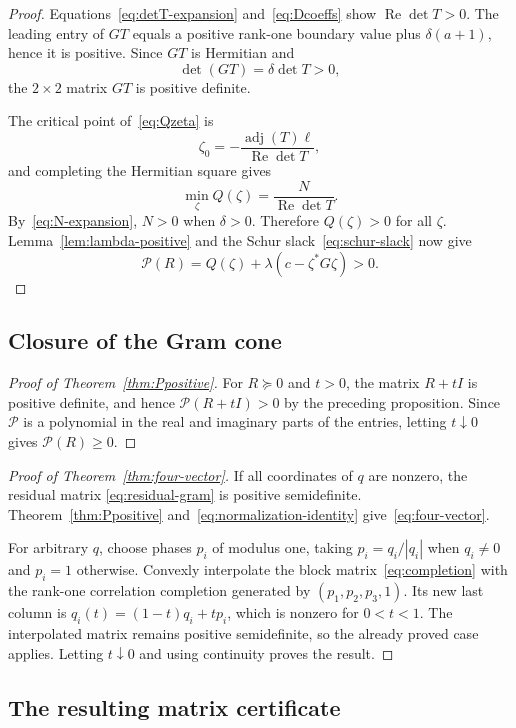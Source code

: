 \documentclass[11pt]{article}
\theoremstyle{definition}
\newcommand{\Rea}{\operatorname{Re}}
\newcommand{\adj}{\operatorname{adj}}
\newcommand{\psd}{\succeq 0}
\begin{document}
\begin{proof}
Equations~\eqref{eq:detT-expansion} and~\eqref{eq:Dcoeffs} show
$\Rea\det T>0$.  The leading entry of $GT$ equals a positive rank-one
boundary value plus $\delta(a+1)$, hence it is positive.  Since $GT$ is
Hermitian and
\[
 \det(GT)=\delta\det T>0,
\]
the $2\times2$ matrix $GT$ is positive definite.

The critical point of~\eqref{eq:Qzeta} is
\[
 \zeta_0=-\frac{\adj(T)\ell}{\Rea\det T},
\]
and completing the Hermitian square gives
\[
 \min_\zeta Q(\zeta)=\frac{N}{\Rea\det T}.
\]
By~\eqref{eq:N-expansion}, $N>0$ when $\delta>0$.  Therefore
$Q(\zeta)>0$ for all $\zeta$.  Lemma~\ref{lem:lambda-positive} and the Schur
slack~\eqref{eq:schur-slack} now give
\[
 \mathcal P(R)=Q(\zeta)+\lambda(c-\zeta^*G\zeta)>0.
\]
\end{proof}

\subsection{Closure of the Gram cone}

\begin{proof}[Proof of Theorem~\ref{thm:Ppositive}]
For $R\psd$ and $t>0$, the matrix $R+tI$ is positive definite, and hence
$\mathcal P(R+tI)>0$ by the preceding proposition.  Since
$\mathcal P$ is a polynomial in the real and imaginary parts of the entries,
letting $t\downarrow0$ gives $\mathcal P(R)\geq0$.
\end{proof}

\begin{proof}[Proof of Theorem~\ref{thm:four-vector}]
If all coordinates of $q$ are nonzero, the residual matrix
\eqref{eq:residual-gram} is positive semidefinite.  Theorem~\ref{thm:Ppositive}
and~\eqref{eq:normalization-identity} give~\eqref{eq:four-vector}.

For arbitrary $q$, choose phases $p_i$ of modulus one, taking
$p_i=q_i/|q_i|$ when $q_i\neq0$ and $p_i=1$ otherwise.  Convexly interpolate
the block matrix~\eqref{eq:completion} with the rank-one correlation
completion generated by $(p_1,p_2,p_3,1)$.  Its new last column is
$q_i(t)=(1-t)q_i+tp_i$, which is nonzero for $0<t<1$.  The interpolated
matrix remains positive semidefinite, so the already proved case applies.
Letting $t\downarrow0$ and using continuity proves the result.
\end{proof}

\subsection{The resulting matrix certificate}
\end{document}
